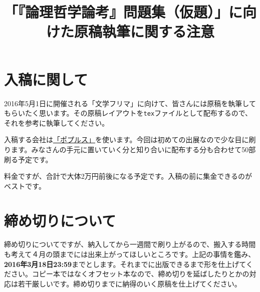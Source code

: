 \documentclass[11pt,a4paper,onecolumn,article]{jarticle}
\title{「『論理哲学論考』問題集（仮題）」に向けた原稿執筆に関する注意}
\date{}
\begin{document}
  \maketitle

  \section{入稿に関して}
  2016年5月1日に開催される「文学フリマ」に向けて、皆さんには原稿を執筆してもらいたく思います。その原稿レイアウトを\texttt{tex}ファイルとして配布するので、それを参考に執筆してください。

  入稿する会社は\href{http://www.inv.co.jp/~popls/}{「ポプルス」}を使います。今回は初めての出展なので少な目に刷ります。みなさんの手元に置いていく分と知り合いに配布する分も合わせて50部刷る予定です。

  料金ですが、合計で大体2万円前後になる予定です。入稿の前に集金できるのがベストです。

  \section{締め切りについて}

  締め切りについてですが、納入してから一週間で刷り上がるので、搬入する時間も考えて４月の頭までには出来上がってほしいところです。上記の事情を鑑み、{\bf 2016年3月18日23:59}までとします。それまでに出版できるまで形を仕上げてください。コピー本ではなくオフセット本なので、締め切りを延ばしたりとかの対応は若干厳しいです。締め切りまでに納得のいく原稿を仕上げてください。
\end{document}
